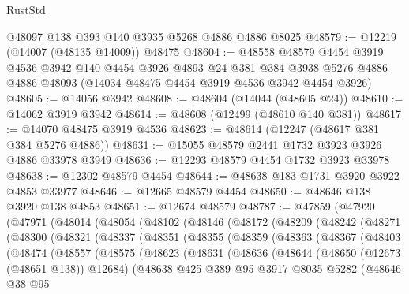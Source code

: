 \begin{lexlean}{RustStd}
\begin{coremodule}
    @48097
    @138
    @393
    @140
    @3935
    @5268
    @4886
    @4886
    @8025
@48579 := @12219 (@14007 (@48135 @14009)) @48475
@48604 := @48558
    @48579
    @4454
    @3919
    @4536
    @3942
    @140
    @4454
    @3926
    @4893
    @24
    @381
    @384
    @3938
    @5276
    @4886
    @4886
    @48093
    (@14034 @48475 @4454 @3919 @4536 @3942 @4454 @3926)
@48605 := @14056 @3942
@48608 := @48604 (@14044 (@48605 @24))
@48610 := @14062 @3919 @3942
@48614 := @48608 (@12499 (@48610 @140 @381))
@48617 := @14070 @48475 @3919 @4536
@48623 := @48614 (@12247 (@48617 @381 @384 @5276 @4886))
@48631 := @15055 @48579 @2441 @1732 @3923 @3926 @4886 @33978 @3949
@48636 := @12293 @48579 @4454 @1732 @3923 @33978
@48638 := @12302 @48579 @4454
@48644 := @48638 @183 @1731 @3920 @3922 @4853 @33977
@48646 := @12665 @48579 @4454
@48650 := @48646 @138 @3920 @138 @4853
@48651 := @12674 @48579
@48787 := @47859
    (@47920
      (@47971
        (@48014
          (@48054
            (@48102
              (@48146
                (@48172
                  (@48209
                    (@48242
                      (@48271
                        (@48300
                          (@48321
                            (@48337
                              (@48351
                                (@48355
                                  (@48359
                                    (@48363
                                      (@48367
                                        (@48403
                                          (@48474
                                            (@48557
                                              (@48575
                                                (@48623
                                                  (@48631
                                                    (@48636
                                                      (@48644
                                                        (@48650 (@12673 (@48651 @138)) @12684)
                                                        (@48638
                                                          @425
                                                          @389
                                                          @95
                                                          @3917
                                                          @8035
                                                          @5282
                                                          (@48646
                                                            @38
                                                            @95

\end{coremodule}
\end{lexlean}

